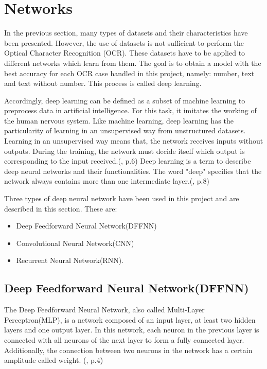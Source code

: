 \author{Bautrelle Fotso}
\graphicspath{ {./src/chapters/developer/media/} }

\section{Networks}
In the previous section, many types of datasets and their characteristics have been presented. 
However, the use of datasets is not sufficient to perform the Optical Character Recognition (OCR). 
These datasets have to be applied to different networks which learn from them. 
The goal is to obtain a model with the best accuracy for each OCR case handled in this project, namely: number, text and text without number.
This process is called deep learning. 

\noindent
Accordingly, deep learning can be defined as a subset of machine learning to preprocess data in artificial 
intelligence. For this task, it imitates the working of the human nervous system.  
Like machine learning, deep learning has the particularity of learning in an unsupervised way from unstructured datasets.  
Learning in an unsupervised way means that, the network receives inputs without outputs. 
During the training, the network must decide itself which output is corresponding to the input received.(\cite{[1]}, p.6)
Deep learning is a term to describe deep neural networks and their functionalities. 
The word "deep" specifies that the network always contains more than one intermediate layer.(\cite{[1]}, p.8) \hfill \break

\noindent
Three types of deep neural network have been used in this project and are described in this section. These are:

\begin{itemize}
    \item Deep Feedforward Neural Network(DFFNN)
    \item Convolutional Neural Network(CNN)
    \item Recurrent Neural Network(RNN).

\end{itemize}


\subsection{Deep Feedforward Neural Network(DFFNN)}
The Deep Feedforward Neural Network, also called Multi-Layer Perceptron(MLP), is a network composed of an input layer,
at least two hidden layers and one output layer. 
In this network, each neuron in the previous layer is connected with all neurons of the next layer to form a fully connected layer. 
Additionally, the connection between two neurons in the network has a certain amplitude called weight. (\cite{[1]}, p.4) 

